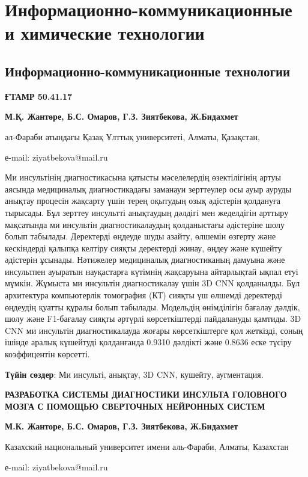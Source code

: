 \let\cleardoublepage\clearpage
\part{Информационно-коммуникационные и химические технологии}
\chapter{Информационно-коммуникационные технологии}

{\bfseries ҒТАМР 50.41.17}


\begin{center}
{\bfseries М.Қ. Жантөре, Б.С. Омаров, Г.З. Зиятбекова, Ж.Бидахмет}

әл-Фараби атындағы Қазақ Ұлттық университеті, Алматы, Қазақстан,

е-mail: ziyatbekova@mail.ru
\end{center}

Ми инсультінің диагностикасына қатысты мәселелердің өзектілігінің артуы
аясында медициналық диагностикадағы заманауи зерттеулер осы ауыр ауруды
анықтау процесін жақсарту үшін терең оқытудың озық әдістерін қолдануға
тырысады. Бұл зерттеу инсультті анықтаудың дәлдігі мен жеделдігін
арттыру мақсатында ми инсультін диагностикалаудың қолданыстағы
әдістеріне шолу болып табылады. Деректерді өңдеуде шуды азайту, өлшемін
өзгерту және кескіндерді қалыпқа келтіру сияқты деректерді жинау, өңдеу
және күшейту әдістерін ұсынады. Нәтижелер медициналық диагностиканың
дамуына және инсультпен ауыратын науқастарға күтімнің жақсаруына
айтарлықтай ықпал етуі мүмкін. Жұмыста ми инсультін диагностикалау үшін
3D CNN қолданылды. Бұл архитектура компьютерлік томография (КТ) сияқты
үш өлшемді деректерді өңдеудің қуатты құралы болып табылады. Модельдің
өнімділігін бағалау дәлдік, шолу және F1-бағалау сияқты әртүрлі
көрсеткіштерді пайдалануды қамтиды. 3D CNN ми инсультін диагностикалауда
жоғары көрсеткіштерге қол жеткізді, соның ішінде аралық күшейтуді
қолданғанда 0.9310 дәлдікті және 0.8636 еске түсіру коэффицентін
көрсетті.

{\bfseries Түйін сөздер}: Ми инсульті, анықтау, 3D CNN, кушейту,
аугментация.

\begin{center}
{\large\bfseries РАЗРАБОТКА СИСТЕМЫ ДИАГНОСТИКИ ИНСУЛЬТА ГОЛОВНОГО МОЗГА С
ПОМОЩЬЮ СВЕРТОЧНЫХ НЕЙРОННЫХ СИСТЕМ}

{\bfseries М.К. Жанторе, Б.С. Омаров, Г.З. Зиятбекова, Ж.Бидахмет}

Казахский национальный университет имени аль-Фараби, Алматы, Казахстан

е-mail: ziyatbekova@mail.ru
\end{center}

